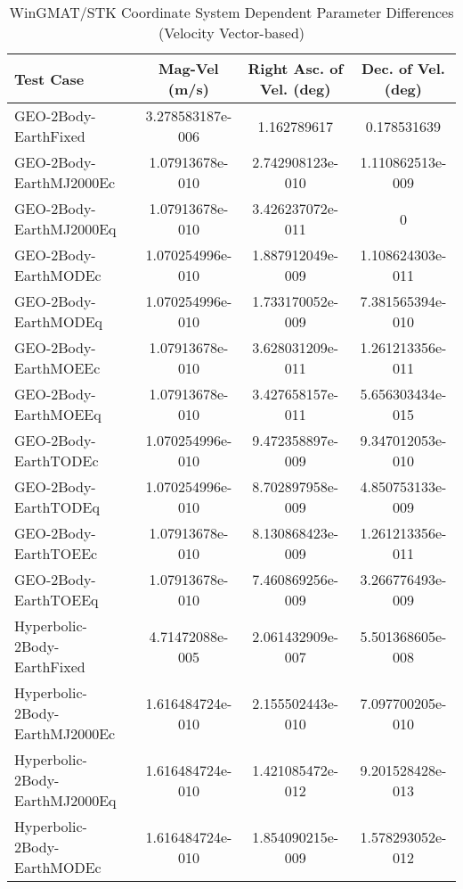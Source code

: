 \begin{table}[htbp!]
\centering
\caption{ WinGMAT/STK Coordinate System Dependent Parameter Differences (Velocity Vector-based)}
      \begin{tabular}{lccc}
      \hline\hline
          Test Case & Mag-Vel (m/s) & Right Asc. of Vel. (deg) & Dec. of Vel. (deg) \\
         \hline
         GEO-2Body-EarthFixed & 3.278583187e-006 & 1.162789617 & 0.178531639 \\
         GEO-2Body-EarthMJ2000Ec & 1.07913678e-010 & 2.742908123e-010 & 1.110862513e-009 \\
         GEO-2Body-EarthMJ2000Eq & 1.07913678e-010 & 3.426237072e-011 & 0 \\
         GEO-2Body-EarthMODEc & 1.070254996e-010 & 1.887912049e-009 & 1.108624303e-011 \\
         GEO-2Body-EarthMODEq & 1.070254996e-010 & 1.733170052e-009 & 7.381565394e-010 \\
         GEO-2Body-EarthMOEEc & 1.07913678e-010 & 3.628031209e-011 & 1.261213356e-011 \\
         GEO-2Body-EarthMOEEq & 1.07913678e-010 & 3.427658157e-011 & 5.656303434e-015 \\
         GEO-2Body-EarthTODEc & 1.070254996e-010 & 9.472358897e-009 & 9.347012053e-010 \\
         GEO-2Body-EarthTODEq & 1.070254996e-010 & 8.702897958e-009 & 4.850753133e-009 \\
         GEO-2Body-EarthTOEEc & 1.07913678e-010 & 8.130868423e-009 & 1.261213356e-011 \\
         GEO-2Body-EarthTOEEq & 1.07913678e-010 & 7.460869256e-009 & 3.266776493e-009 \\
         Hyperbolic-2Body-EarthFixed & 4.71472088e-005 & 2.061432909e-007 & 5.501368605e-008 \\
         Hyperbolic-2Body-EarthMJ2000Ec & 1.616484724e-010 & 2.155502443e-010 & 7.097700205e-010 \\
         Hyperbolic-2Body-EarthMJ2000Eq & 1.616484724e-010 & 1.421085472e-012 & 9.201528428e-013 \\
         Hyperbolic-2Body-EarthMODEc & 1.616484724e-010 & 1.854090215e-009 & 1.578293052e-012 \\

\end{tabular}
\end{table}
